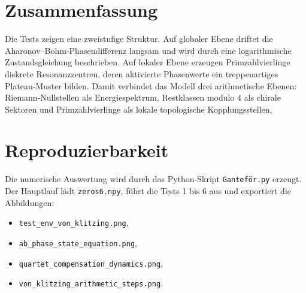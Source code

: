 \documentclass[11pt,a4paper]{article}
\begin{document}
\section{Zusammenfassung}

Die Tests zeigen eine zweistufige Struktur. Auf globaler Ebene driftet die
Aharonov--Bohm-Phasendifferenz langsam und wird durch eine logarithmische
Zustandsgleichung beschrieben. Auf lokaler Ebene erzeugen Primzahlvierlinge diskrete
Resonanzzentren, deren aktivierte Phasenwerte ein treppenartiges Plateau-Muster bilden.
Damit verbindet das Modell drei arithmetische Ebenen: Riemann-Nullstellen als
Energiespektrum, Restklassen modulo $4$ als chirale Sektoren und Primzahlvierlinge als
lokale topologische Kopplungsstellen.

\section*{Reproduzierbarkeit}

Die numerische Auswertung wird durch das Python-Skript \texttt{Ganteför.py} erzeugt. Der
Hauptlauf lädt \texttt{zeros6.npy}, führt die Tests 1 bis 6 aus und exportiert die
Abbildungen:
\begin{itemize}
  \item \texttt{test\_env\_von\_klitzing.png},
  \item \texttt{ab\_phase\_state\_equation.png},
  \item \texttt{quartet\_compensation\_dynamics.png},
  \item \texttt{von\_klitzing\_arithmetic\_steps.png}.
\end{itemize}
\end{document}
